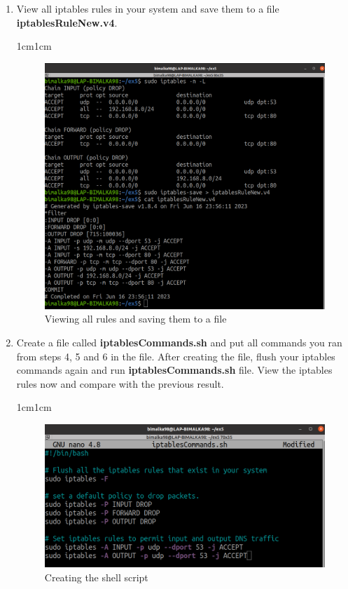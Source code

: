\documentclass[11pt,letterpaper]{article}
\newenvironment{answer}{\em \color{blue} \begin{adjustwidth}{1cm}{1cm}}{\end{adjustwidth}}
\begin{document}
\begin{enumerate}
		\item View all iptables rules in your system and save them to a file \textbf{iptablesRuleNew.v4}. 
		\begin{answer}
			\begin{figure}[H]
				\centering
				\includegraphics[width=0.65\columnwidth]{images/part1/9.png}
				\caption{Viewing all rules and saving them to a file}
			\end{figure}
		\end{answer}
		\pagebreak
		\item Create a file called \textbf{iptablesCommands.sh} and put all commands you ran from steps 4, 5 and 6 in the file. After creating the file, flush your iptables commands again and run \textbf{iptablesCommands.sh} file. View the iptables rules now and compare with the previous result.
		
		\begin{answer}
			\begin{figure}[H]
				\centering
				\includegraphics[width=0.65\columnwidth]{images/part1/10_1.png}
				\caption{Creating the shell script}
			\end{figure}
			

\end{answer}
\end{enumerate}
\end{document}
